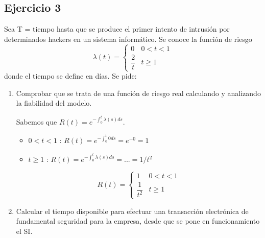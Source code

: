 \subsection{Ejercicio 3}
Sea T = tiempo hasta que se produce el primer intento de intrusión por determinados hackers en un sistema informático. Se conoce la función de riesgo
\[ \lambda(t)=\begin{cases} 
      0 & 0<t<1 \\
      \dfrac{2}{t} & t\geq 1 
   \end{cases}
\]
donde el tiempo se define en días. Se pide:
\begin{enumerate}
    \item Comprobar  que  se  trata  de  una  función  de  riesgo  real  calculando  y  analizando  la  fiabilidad  del modelo.
    \begin{tcolorbox}[colback=white,colframe=cyan!50!black,fonttitle=\bfseries]
    Sabemos que $R(t) = e^{-\int_0^t \lambda(s) ds}$.
    \begin{itemize}
        \item $0<t<1$ : $R(t)=e^{-\int_0^t 0 ds} = e^{-0}=1$
        \item $t\geq 1$ : $R(t)=e^{-\int_0^t \lambda(s) ds} = ... = 1/t^2$
    \end{itemize}
    \[ R(t)=\begin{cases} 
      1 & 0<t<1 \\
      \dfrac{1}{t^2} & t\geq 1 
   \end{cases}
    \]  
        \begin{center}
        \end{center}
        \end{tcolorbox}
    \item Calcular  el  tiempo  disponible  para  efectuar  una  transacción  electrónica  de  fundamental  seguridad para la empresa, desde que se pone en funcionamiento el SI.
    \begin{tcolorbox}[colback=white,colframe=cyan!50!black,fonttitle=\bfseries]

\end{tcolorbox}
\end{enumerate}
